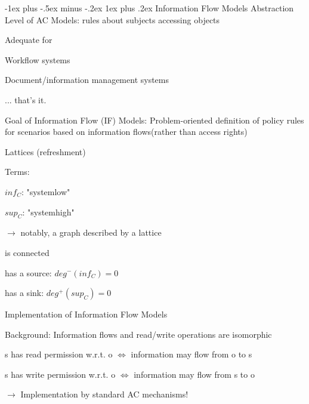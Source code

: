 \documentclass[a4paper]{article}
\makeatletter
\renewcommand{\subsubsection}{\@startsection{subsubsection}{3}{0mm}%
                                {-1ex plus -.5ex minus -.2ex}%
                                {1ex plus .2ex}%
                                {\normalfont\small\bfseries}}
\makeatother
\begin{document}
\begin{multicols}{3}
    \subsubsection{Information Flow Models}
    Abstraction Level of AC Models: rules about subjects accessing objects

    Adequate for
    \begin{itemize*}
        \item Workflow systems
        \item Document/information management systems
        \item ... that’s it.
    \end{itemize*}

    Goal of Information Flow (IF) Models: Problem-oriented definition of policy rules for scenarios based on information flows(rather than access rights)

    Lattices (refreshment)
    \begin{itemize*}
        \item Terms:
              \begin{itemize*}
                  \item $inf_C$: "systemlow"
                  \item $sup_C$: "systemhigh"
              \end{itemize*}
        \item $\rightarrow$ notably, a graph described by a lattice
        \item is connected
        \item has a source: $deg^-(inf_C)= 0$
        \item has a sink: $deg^+(sup_C)= 0$
    \end{itemize*}

    Implementation of Information Flow Models
    \begin{itemize*}
        \item Background: Information flows and read/write operations are isomorphic
              \begin{itemize*}
                  \item s has read permission w.r.t. o $\Leftrightarrow$ information may flow from o to s
                  \item s has write permission w.r.t. o $\Leftrightarrow$ information may flow from s to o
              \end{itemize*}
        \item $\rightarrow$ Implementation by standard AC mechanisms!
    \end{itemize*}


\end{multicols}
\end{document}
